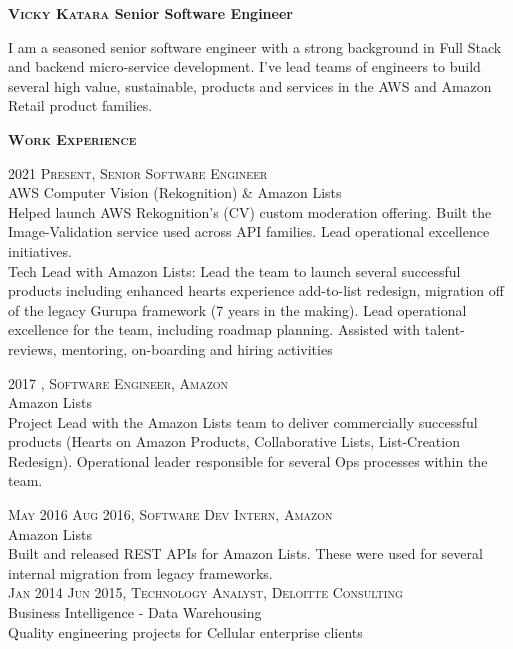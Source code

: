 \documentclass[letterpaper,12pt,final]{memoir}
\newcommand{\Sep}{\vspace{1.5em}}
\newcommand{\SmallSep}{\vspace{0.5em}}
\newenvironment{Objective}
	{\ignorespaces\textbf{\color{Plum} Objective}}
	{\Sep\ignorespacesafterend}
\newcommand{\CVSection}[1]
	{\Large\textbf{\textsc{{#1}}}\par
	\SmallSep\normalsize\normalfont}
\newcommand{\CVItem}[1]
	{\textsc{\color{Plum} #1}}
\begin{document}
\Huge\bfseries \textsc{\color{Plum} Vicky Katara}
{\normalsize \bfseries  Senior Software Engineer }
\SmallSep

\normalsize\normalfont

\begin{footnotesize}
I am a seasoned senior software engineer with a strong background in Full Stack and backend micro-service development. I've lead teams of engineers to build several high value, sustainable, products and services in the AWS  and Amazon Retail product families.
\end{footnotesize}

\CVSection{Work Experience}

\CVItem{2021 \textendash \space Present, Senior Software Engineer}\\
\SmallSep
AWS Computer Vision (Rekognition) \& Amazon Lists\\
{\footnotesize Helped launch AWS Rekognition's (CV) custom moderation offering. Built the Image-Validation service used across API families. Lead operational excellence initiatives. \\
Tech Lead with Amazon Lists: Lead the team to launch several successful products including enhanced hearts experience add-to-list redesign, migration off of the legacy Gurupa framework (7 years in the making). Lead operational excellence for the team, including roadmap planning. Assisted with talent-reviews, mentoring, on-boarding and hiring activities}

\CVItem{2017 \textendash {}, Software Engineer, Amazon}\\
\SmallSep
Amazon Lists\\
{\footnotesize Project Lead with the Amazon Lists team to deliver commercially successful products (Hearts on Amazon Products, Collaborative Lists, List-Creation Redesign). Operational leader responsible for several Ops processes within the team.}

\CVItem{May 2016 \textendash \space Aug 2016, Software Dev Intern, Amazon}\\
\SmallSep
Amazon Lists\\
{\footnotesize Built and released REST APIs for Amazon Lists. These were used for several internal migration from legacy frameworks.}
\SmallSep\\
\CVItem{Jan 2014 \textendash \space Jun 2015, Technology Analyst, Deloitte Consulting}\\
\SmallSep
Business Intelligence - Data Warehousing\\
{\footnotesize Quality engineering projects for Cellular enterprise clients}
\SmallSep
\end{document}
